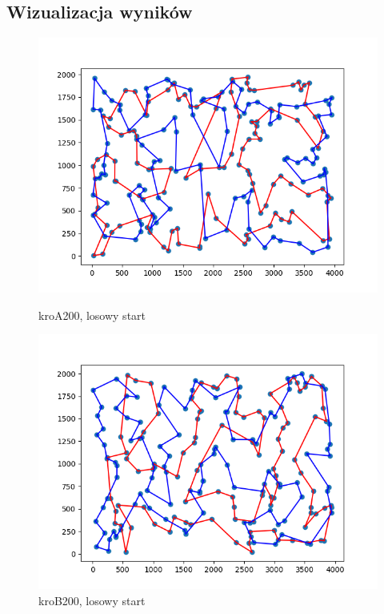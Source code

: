 \documentclass[11pt]{article}
\begin{document}
\subsection{Wizualizacja wyników}
\begin{figure}[H]
    \centering
    \begin{minipage}[t]{0.45\textwidth}
        \centering
        \includegraphics[width=\linewidth]{best_paths/kroA200/traverse_greedy/randomstart.png}
        \caption{kroA200, losowy start}
    \end{minipage}
    \hfill
    \begin{minipage}[t]{0.45\textwidth}
        \centering
        \includegraphics[width=\linewidth]{best_paths/kroB200/traverse_greedy/randomstart.png}
        \caption{kroB200, losowy start}
    \end{minipage}


\end{figure}
\end{document}
